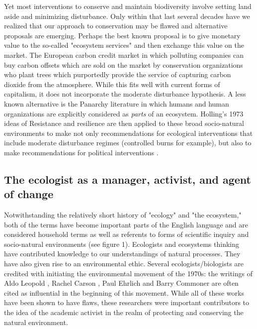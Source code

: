 Yet most interventions to conserve and maintain biodiversity involve setting land aside and minimizing disturbance. Only within that last several decades have we realized that our approach to conservation may be flawed and alternative proposals are emerging. Perhaps the best known proposal is to give monetary value to the so-called "ecosystem services" and then exchange this value on the market. The European carbon credit market in which polluting companies can buy carbon offsets which are sold on the market by conservation organizations who plant trees which purportedly provide the service of capturing carbon dioxide from the atmosphere. While this fits well with current forms of capitalism, it does not incorporate the moderate disturbance hypothesis. A less known alternative is the Panarchy literature in which humans and human organizations are explicitly considered as \textit{parts} of an ecosystem. Holling's 1973 ideas of Resistance and resilience are then applied to these broad socio-natural environments to make not only recommendations for ecological interventions that include moderate disturbance regimes (controlled burns for example), but also to make recommendations for political interventions \citep{holling_2002}.

\subsection{The ecologist as a manager, activist, and agent of change}

 Notwithstanding the relatively short history of "ecology" and "the ecosystem," both of the terms have become important parts of the English language and are considered household terms as well as referents to forms of scientific inquiry and socio-natural environments (see figure 1). Ecologists and ecosystems thinking have contributed knowledge to our understandings of natural processes. They have also given rise to an environmental ethic. Several ecologists/biologists are credited with initiating the environmental movement of the 1970s: the writings of Aldo Leopold \citep{leopold_1949}, Rachel Carson \citep{carson_1962}, Paul Ehrlich \citep{ehrlich_1968} and Barry Commoner \citep{commoner_1971} are often cited as influential in the beginning of this movement. While all of these works have been shown to have flaws, these researchers were important contributors to the idea of the academic activist in the realm of protecting and conserving the natural environment. 
 
